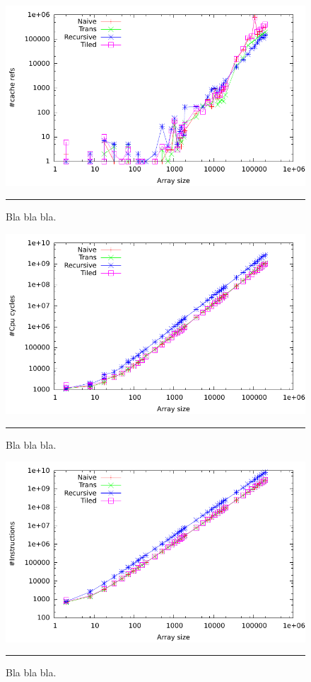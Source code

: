\begin{figure}[htbp]
	\centering
		\includegraphics[width=\textwidth]{./Figures/Project2a/Cache_refs.pdf}
		\rule{35em}{0.5pt}
	\caption[Cache refs]{
	Bla bla bla.
	}
	\label{fig:Cache_refs}
\end{figure}



\begin{figure}[htbp]
	\centering
		\includegraphics[width=\textwidth]{./Figures/Project2a/Cpu_cycles.pdf}
		\rule{35em}{0.5pt}
	\caption[CPU cycles]{
	Bla bla bla.
	}
	\label{fig:Cpu_cycles}
\end{figure}


\begin{figure}[htbp]
	\centering
		\includegraphics[width=\textwidth]{./Figures/Project2a/Instructions.pdf}
		\rule{35em}{0.5pt}
	\caption[Instructions]{
	Bla bla bla.
	}
	\label{fig:Instructions}
\end{figure}
